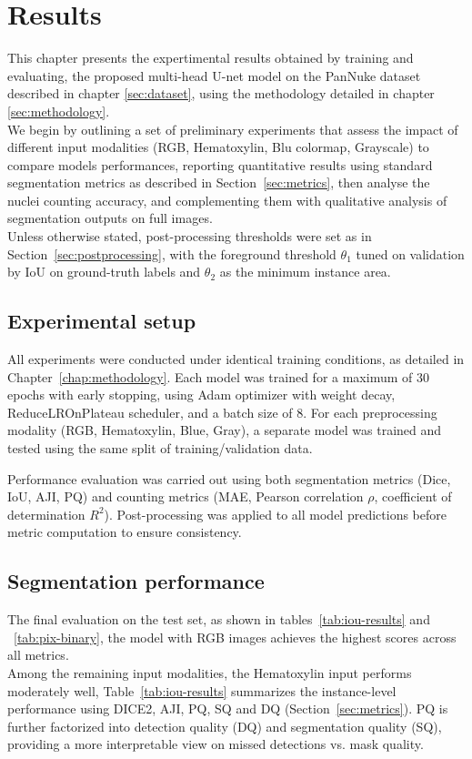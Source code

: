 \documentclass[target=bach,aauheader=,style=]{thud}
\begin{document}
\chapter{Results}
\label{chap:results}

This chapter presents the expertimental results obtained by training and evaluating, the proposed multi-head U-net model on the PanNuke dataset described in chapter \ref{sec:dataset}, using the methodology detailed in chapter \ref{sec:methodology}.\\
We begin by outlining a set of preliminary experiments that assess the impact of different input modalities (RGB, Hematoxylin, Blu colormap, Grayscale) to compare models performances, reporting quantitative results using standard segmentation metrics as described in Section~\ref{sec:metrics}, then analyse the nuclei counting accuracy, and complementing them with qualitative analysis of segmentation outputs on full images.\\
Unless otherwise stated, post-processing thresholds were set as in Section~\ref{sec:postprocessing}, with the foreground threshold $\theta_1$ tuned on validation by IoU on ground-truth labels and $\theta_2$ as the minimum instance area.

\section{Experimental setup}
All experiments were conducted under identical training conditions, as detailed in Chapter~\ref{chap:methodology}. 
Each model was trained for a maximum of 30 epochs with early stopping, using Adam optimizer with weight decay, ReduceLROnPlateau scheduler, and a batch size of 8. 
For each preprocessing modality (RGB, Hematoxylin, Blue, Gray), a separate model was trained and tested using the same split of training/validation data.

Performance evaluation was carried out using both segmentation metrics (Dice, IoU, AJI, PQ) and counting metrics (MAE, Pearson correlation $\rho$, coefficient of determination $R^2$). 
Post-processing was applied to all model predictions before metric computation to ensure consistency.

\section{Segmentation performance}

The final evaluation on the test set, as shown in tables~\ref{tab:iou-results} and ~\ref{tab:pix-binary}, the model with RGB images achieves the highest scores across all metrics.\\
Among the remaining input modalities, the Hematoxylin input performs moderately well,  
Table~\ref{tab:iou-results}  summarizes the instance-level performance using DICE2, AJI, PQ, SQ and DQ (Section~\ref{sec:metrics}). 
PQ is further factorized into detection quality (DQ) and segmentation quality (SQ), providing a more interpretable view on missed detections vs. mask quality.
\end{document}
